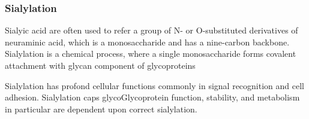\subsubsection {Sialylation}
Sialyic acid are often used to refer a group of N- or O-substituted derivatives of neuraminic acid, which is a monosaccharide and has a nine-carbon backbone.~\cite{Vocadlo_2009} Sialylation is a chemical process, where a single monosaccharide forms covalent attachment with glycan component of glycoproteins

Sialylation has profond cellular functions commonly in signal recognition and cell adhesion. Sialylation caps glycoGlycoprotein function, stability, and metabolism in particular are dependent upon correct sialylation.